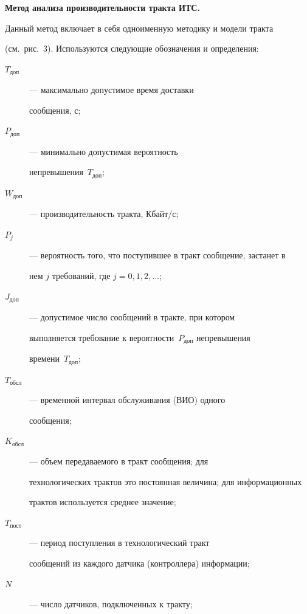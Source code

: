         


        \smallskip


        \textbf{Метод анализа производительности тракта ИТС.} 


Данный метод включает в себя одноименную методику и модели тракта 


(см.\ рис.~3). Используются следующие обозначения и определения:


\begin{description}


\item[$T_{\mathrm{доп}}$] --- максимально допустимое время доставки 


сообщения, с;


\item[$P_{\mathrm{доп}}$] --- минимально допустимая вероятность 


непревышения~$T_{\mathrm{доп}}$;


\item[$W_{\mathrm{доп}}$] --- производительность тракта, Кбайт/с;


\item[$P_j$] --- вероятность того, что поступившее в тракт сообщение, застанет в 


нем $j$ требований, где $j=0, 1, 2, \ldots$;


\item[$J_{\mathrm{доп}}$] --- допустимое число сообщений в тракте, при котором 


выполняется требование к вероятности~$P_{\mathrm{доп}}$ непревышения 


времени~$T_{\mathrm{доп}}$;


\item[$T_{\mathrm{обсл}}$] --- временной интервал обслуживания (ВИО) одного 


сообщения;


\item[$K_{\mathrm{обсл}}$] --- объем передаваемого в тракт сообщения; для 


технологических трактов это постоянная величина; для информационных 


трактов используется среднее значение;


\item[$T_{\mathrm{пост}}$] --- период поступления в технологический тракт 


сообщений из каждого датчика (контроллера) информации;


\item[$N$] --- число датчиков, подключенных к тракту;



\end{description}
